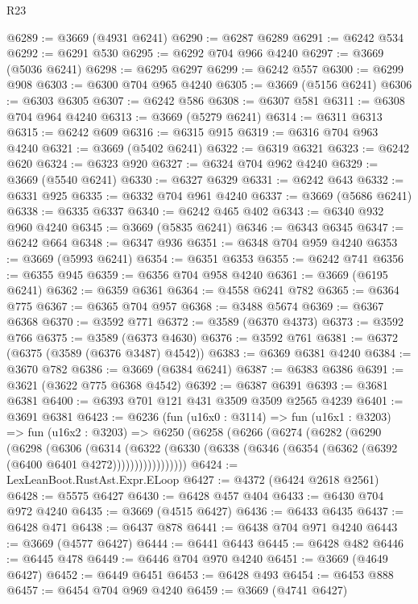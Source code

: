 \begin{lexlean}{R23}
\begin{coremodule}
@6289 := @3669 (@4931 @6241)
@6290 := @6287 @6289
@6291 := @6242 @534
@6292 := @6291 @530
@6295 := @6292 @704 @966 @4240
@6297 := @3669 (@5036 @6241)
@6298 := @6295 @6297
@6299 := @6242 @557
@6300 := @6299 @908
@6303 := @6300 @704 @965 @4240
@6305 := @3669 (@5156 @6241)
@6306 := @6303 @6305
@6307 := @6242 @586
@6308 := @6307 @581
@6311 := @6308 @704 @964 @4240
@6313 := @3669 (@5279 @6241)
@6314 := @6311 @6313
@6315 := @6242 @609
@6316 := @6315 @915
@6319 := @6316 @704 @963 @4240
@6321 := @3669 (@5402 @6241)
@6322 := @6319 @6321
@6323 := @6242 @620
@6324 := @6323 @920
@6327 := @6324 @704 @962 @4240
@6329 := @3669 (@5540 @6241)
@6330 := @6327 @6329
@6331 := @6242 @643
@6332 := @6331 @925
@6335 := @6332 @704 @961 @4240
@6337 := @3669 (@5686 @6241)
@6338 := @6335 @6337
@6340 := @6242 @465 @402
@6343 := @6340 @932 @960 @4240
@6345 := @3669 (@5835 @6241)
@6346 := @6343 @6345
@6347 := @6242 @664
@6348 := @6347 @936
@6351 := @6348 @704 @959 @4240
@6353 := @3669 (@5993 @6241)
@6354 := @6351 @6353
@6355 := @6242 @741
@6356 := @6355 @945
@6359 := @6356 @704 @958 @4240
@6361 := @3669 (@6195 @6241)
@6362 := @6359 @6361
@6364 := @4558 @6241 @782
@6365 := @6364 @775
@6367 := @6365 @704 @957
@6368 := @3488 @5674
@6369 := @6367 @6368
@6370 := @3592 @771
@6372 := @3589 (@6370 @4373)
@6373 := @3592 @766
@6375 := @3589 (@6373 @4630)
@6376 := @3592 @761
@6381 := @6372 (@6375 (@3589 (@6376 @3487) @4542))
@6383 := @6369 @6381 @4240
@6384 := @3670 @782
@6386 := @3669 (@6384 @6241)
@6387 := @6383 @6386
@6391 := @3621 (@3622 @775 @6368 @4542)
@6392 := @6387 @6391
@6393 := @3681 @6381
@6400 := @6393 @701 @121 @431 @3509 @3509 @2565 @4239
@6401 := @3691 @6381
@6423 := @6236
    (fun (u16x0 : @3114) =>
    fun (u16x1 : @3203) =>
    fun (u16x2 : @3203) =>
    @6250
      (@6258
        (@6266
          (@6274
            (@6282
              (@6290
                (@6298
                  (@6306
                    (@6314
                      (@6322
                        (@6330
                          (@6338 (@6346 (@6354 (@6362 (@6392 (@6400 @6401 @4272)))))))))))))))))
@6424 := LexLeanBoot.RustAst.Expr.ELoop
@6427 := @4372 (@6424 @2618 @2561)
@6428 := @5575 @6427
@6430 := @6428 @457 @404
@6433 := @6430 @704 @972 @4240
@6435 := @3669 (@4515 @6427)
@6436 := @6433 @6435
@6437 := @6428 @471
@6438 := @6437 @878
@6441 := @6438 @704 @971 @4240
@6443 := @3669 (@4577 @6427)
@6444 := @6441 @6443
@6445 := @6428 @482
@6446 := @6445 @478
@6449 := @6446 @704 @970 @4240
@6451 := @3669 (@4649 @6427)
@6452 := @6449 @6451
@6453 := @6428 @493
@6454 := @6453 @888
@6457 := @6454 @704 @969 @4240
@6459 := @3669 (@4741 @6427)

\end{coremodule}
\end{lexlean}
